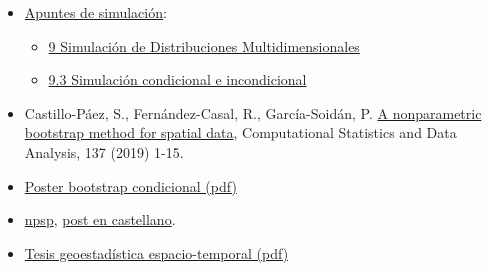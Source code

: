 \documentclass[]{book}
\theoremstyle{definition}
\theoremstyle{definition}
\theoremstyle{definition}
\theoremstyle{remark}
\begin{document}
\begin{itemize}
\item
  \href{https://rubenfcasal.github.io/simbook}{Apuntes de simulación}:

  \begin{itemize}
  \item
    \href{https://rubenfcasal.github.io/simbook/simulacion-de-distribuciones-multidimensionales.html}{9
    Simulación de Distribuciones Multidimensionales}
  \item
    \href{https://rubenfcasal.github.io/simbook/simulacion-de-distribuciones-multidimensionales.html\#simulacion-condicional-e-incondicional}{9.3
    Simulación condicional e incondicional}
  \end{itemize}
\item
  Castillo-Páez, S., Fernández-Casal, R., García-Soidán, P.
  \href{https://www.sciencedirect.com/science/article/pii/S0167947319300325?via\%3Dihub}{A
  nonparametric bootstrap method for spatial data}, Computational
  Statistics and Data Analysis, 137 (2019) 1-15.
\item
  \href{./Poster_METMA9_2.pdf}{Poster bootstrap condicional (pdf)}
\item
  \href{https://rubenfcasal.github.io/npsp/index.html}{npsp},
  \href{https://rubenfcasal.github.io/post/geoestadistica-no-parametrica-con-el-paquete-npsp/}{post
  en castellano}.
\item
  \href{https://rubenfcasal.github.io/Geoestadistica_espacio-temporal.pdf}{Tesis
  geoestadística espacio-temporal (pdf)}
\end{itemize}


\end{document}
